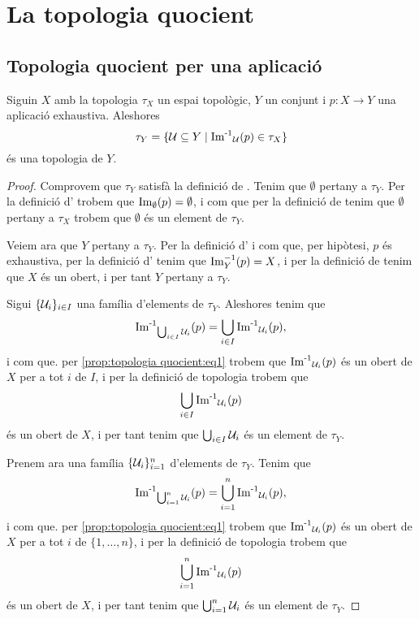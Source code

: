 \documentclass[../Apunts.tex]{subfiles}
\begin{document}
	\section{La topologia quocient}
	\subsection{Topologia quocient per una aplicació}
	\begin{proposition}
		\label{prop:topologia quocient}
		Siguin \(X\) amb la topologia \(\tau_{X}\) un espai topològic, \(Y\) un conjunt i \(p\colon X\longrightarrow Y\) una aplicació exhaustiva. Aleshores
		\begin{equation}
			\label{prop:topologia quocient:eq1}
			\tau_{Y}=\{\mathcal{U}\subseteq Y\mid\operatorname{\operatorname{Im}^{-1}}_{\mathcal{U}}(p)\in\tau_{X}\}
		\end{equation}
		és una topologia de \(Y\).
		\begin{proof} %
			Comprovem que \(\tau_{Y}\) satisfà la definició de . Tenim que \(\emptyset\) pertany a \(\tau_{Y}\). Per la definició d' trobem que \(\operatorname{Im}_{\emptyset}(p)=\emptyset\), i com que per la definició de  tenim que \(\emptyset\) pertany a \(\tau_{X}\) trobem que \(\emptyset\) és un element de \(\tau_{Y}\).
			
			Veiem ara que \(Y\) pertany a \(\tau_{Y}\). Per la definició d' i com que, per hipòtesi, \(p\) és exhaustiva, per la definició d' tenim que \(\operatorname{Im}_{Y}^{-1}(p)=X\), i per la definició de  tenim que \(X\) és un obert, i per tant \(Y\) pertany a \(\tau_{Y}\).
			
			Sigui \(\{\mathcal{U}_{i}\}_{i\in I}\) una família d'elements de \(\tau_{Y}\). Aleshores tenim que
			\[\operatorname{\operatorname{Im}^{-1}}_{\bigcup_{i\in I}\mathcal{U}_{i}}(p)=\bigcup_{i\in I}\operatorname{\operatorname{Im}^{-1}}_{\mathcal{U}_{i}}(p),\]
			i com que. per \eqref{prop:topologia quocient:eq1} trobem que \(\operatorname{\operatorname{Im}^{-1}}_{\mathcal{U}_{i}}(p)\) és un obert de \(X\) per a tot \(i\) de \(I\), i per la definició de topologia trobem que
			\[\bigcup_{i\in I}\operatorname{\operatorname{Im}^{-1}}_{\mathcal{U}_{i}}(p)\]
			és un obert de \(X\), i per tant tenim que \(\bigcup_{i\in I}\mathcal{U}_{i}\) és un element de \(\tau_{Y}\).
			
			Prenem ara una família \(\{\mathcal{U}_{i}\}_{i=1}^{n}\) d'elements de \(\tau_{Y}\). Tenim que
			\[\operatorname{\operatorname{Im}^{-1}}_{\bigcup_{i=1}^{n}\mathcal{U}_{i}}(p)=\bigcup_{i=1}^{n}\operatorname{\operatorname{Im}^{-1}}_{\mathcal{U}_{i}}(p),\]
			i com que. per \eqref{prop:topologia quocient:eq1} trobem que \(\operatorname{\operatorname{Im}^{-1}}_{\mathcal{U}_{i}}(p)\) és un obert de \(X\) per a tot \(i\) de \(\{1,\dots,n\}\), i per la definició de topologia trobem que
			\[\bigcup_{i=1}^{n}\operatorname{\operatorname{Im}^{-1}}_{\mathcal{U}_{i}}(p)\]
			és un obert de \(X\), i per tant tenim que \(\bigcup_{i=1}^{n}\mathcal{U}_{i}\) és un element de \(\tau_{Y}\).
		\end{proof}
	\end{proposition}
\end{document}
